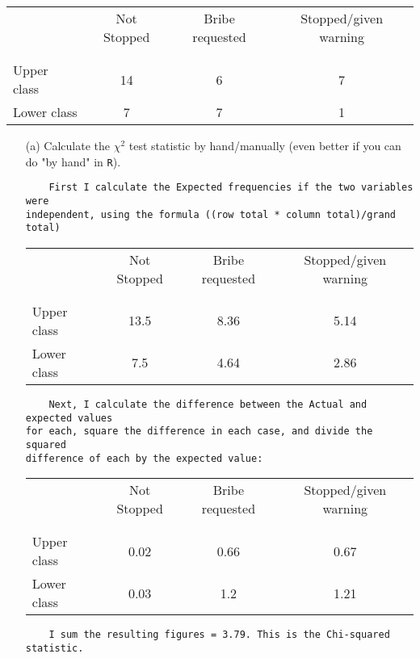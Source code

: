 \documentclass[12pt,letterpaper]{article}
\begin{document}
\begin{table}[h!]
	\centering
	\begin{tabular}{l | c c c }
		& Not Stopped & Bribe requested & Stopped/given warning \\
		\\[-1.8ex] 
		\hline \\[-1.8ex]
		Upper class & 14 & 6 & 7 \\
		Lower class & 7 & 7 & 1 \\
		\hline
	\end{tabular}
\end{table}
\begin{enumerate}
	
	\item [(a)]
	Calculate the $\chi^2$ test statistic by hand/manually (even better if you can do "by hand" in \texttt{R}).\\
\begin{verbatim}
	First I calculate the Expected frequencies if the two variables were
independent, using the formula ((row total * column total)/grand total)
\end{verbatim}
	
\begin{table}[h!]
	\centering
	\begin{tabular}{l | c c c }
		& Not Stopped & Bribe requested & Stopped/given warning \\
		\\[-1.8ex] 
		\hline \\[-1.8ex]
		Upper class & 13.5 & 8.36 & 5.14  \\
		Lower class & 7.5 & 4.64 & 2.86  \\
		\hline
	\end{tabular}
\end{table}
\begin{verbatim}
	Next, I calculate the difference between the Actual and expected values
for each, square the difference in each case, and divide the squared
difference of each by the expected value:
\end{verbatim}
\begin{table}[h!]
	\centering
	\begin{tabular}{l | c c c }
		& Not Stopped & Bribe requested & Stopped/given warning \\
		\\[-1.8ex] 
		\hline \\[-1.8ex]
		Upper class & 0.02 & 0.66 & 0.67  \\
		Lower class & 0.03 & 1.2 & 1.21  \\
		\hline
	\end{tabular}
\end{table}
\begin{verbatim}
	I sum the resulting figures = 3.79. This is the Chi-squared statistic.
\end{verbatim}


\end{enumerate}
\end{document}
